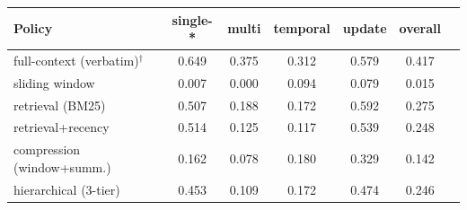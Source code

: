 \begin{tabular}{lcccccc}
\toprule
Policy & single-* & multi & temporal & update & overall \\
\midrule
full-context (verbatim)$^{\dagger}$ & 0.649 & 0.375 & 0.312 & 0.579 & 0.417 \\
sliding window & 0.007 & 0.000 & 0.094 & 0.079 & 0.015 \\
retrieval (BM25) & 0.507 & 0.188 & 0.172 & 0.592 & 0.275 \\
retrieval+recency & 0.514 & 0.125 & 0.117 & 0.539 & 0.248 \\
compression (window+summ.) & 0.162 & 0.078 & 0.180 & 0.329 & 0.142 \\
hierarchical (3-tier) & 0.453 & 0.109 & 0.172 & 0.474 & 0.246 \\
\bottomrule
\end{tabular}